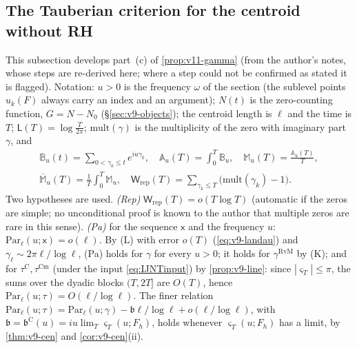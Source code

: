 \documentclass[11pt,a4paper]{article}
\numberwithin{equation}{section}
\theoremstyle{definition}
\theoremstyle{remark}
\newcommand{\Cm}{\mathrm{Cm}}
\begin{document}
\subsection{The Tauberian criterion for the centroid without RH}\label{sec:v14-taub}
This subsection develops part~(c) of \cref{prop:v11-gamma} (from the author's notes, whose steps are re-derived here; where a step could not be confirmed as stated it is flagged). Notation: $u>0$ is the frequency $\omega$ of the section (the sublevel points $u_k(F)$ always carry an index and an argument); $N(t)$ is the zero-counting function, $G=N-N_0$ (\S\ref{sec:v9-objects}); the centroid length is $\ell$ and the time is $T$; $\mathsf L(T)=\log\frac T{2\pi}$; $\mathrm{mult}(\gamma)$ is the multiplicity of the zero with imaginary part $\gamma$, and
\begin{gather}
\mathbb B_u(t)=\sum_{0<\gamma_k\le t}e^{iu\gamma_k},\quad
\mathbb A_u(T)=\int_0^T\mathbb B_u,\quad
\mathbb M_u(T)=\frac{\mathbb A_u(T)}T,\\
\overline{\mathbb M}_u(T)=\frac1T\int_0^T\mathbb M_u,\quad
\mathsf W_{\mathrm{rep}}(T)=\sum_{\gamma_k\le T}\bigl(\mathrm{mult}(\gamma_k)-1\bigr).
\end{gather}
Two hypotheses are used. \emph{(Rep)} $\mathsf W_{\mathrm{rep}}(T)=o(T\log T)$ (automatic if the zeros are simple; no unconditional proof is known to the author that multiple zeros are rare in this sense). \emph{(Pa)} for the sequence $\mathsf x$ and the frequency $u$: $\mathrm{Par}_\ell(u;\mathsf x)=o(\ell)$. By (L) with error $o(T)$ (\eqref{eq:v9-landau}) and $\gamma_\ell\sim2\pi\ell/\log\ell$, (Pa) holds for $\gamma$ for every $u>0$; it holds for $\gamma^{\mathrm{RvM}}$ by (K); and for $\tau^{\mathrm C},\tau^{\Cm}$ (under the input \eqref{eq:IJNTinput}) by \cref{prop:v9-line}: since $|\varsigma_T|\le\pi$, the sums over the dyadic blocks $(T,2T]$ are $O(T)$, hence $\mathrm{Par}_\ell(u;\tau)=O(\ell/\log\ell)$. The finer relation $\mathrm{Par}_\ell(u;\tau)=\mathrm{Par}_\ell(u;\gamma)-\mathfrak b\ell/\log\ell+o(\ell/\log\ell)$, with $\mathfrak b=\mathfrak b^{\mathrm C}(u)=iu\lim_T\varsigma_T(u;F_h)$, holds whenever $\varsigma_T(u;F_h)$ has a limit, by \cref{thm:v9-cen} and \cref{cor:v9-cen}(ii).
\end{document}
